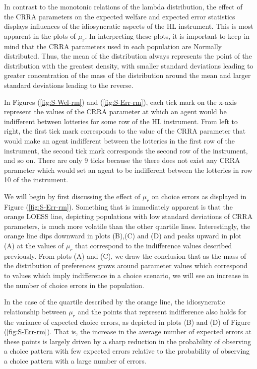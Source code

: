 \documentclass[11pt,a4paper]{report}
\begin{document}
In contrast to the monotonic relations of the lambda distribution, the effect of the CRRA parameters on the expected welfare and expected error statistics displays influences of the idiosyncratic aspects of the HL instrument.
This is most apparent in the plots of $\mu_r$.
In interpreting these plots, it is important to keep in mind that the CRRA parameters used in each population are Normally distributed.
Thus, the mean of the distribution always represents the point of the distribution with the greatest density, with smaller standard deviations leading to greater concentration of the mass of the distribution around the mean and larger standard deviations leading to the reverse.

In Figures (\ref{fig:S-Wel-rm}) and (\ref{fig:S-Err-rm}), each tick mark on the x-axis represent the values of the CRRA parameter at which an agent would be indifferent between lotteries for some row of the HL instrument.
From left to right, the first tick mark corresponds to the value of the CRRA parameter that would make an agent indifferent between the lotteries in the first row of the instrument, the second tick mark corresponds the second row of the instrument, and so on.
There are only 9 ticks because the there does not exist any CRRA parameter which would set an agent to be indifferent between the lotteries in row 10 of the instrument.

We will begin by first discussing the effect of $\mu_r$ on choice errors as displayed in Figure (\ref{fig:S-Err-rm}).
Something that is immediately apparent is that the orange LOESS line, depicting populations with low standard deviations of CRRA parameters, is much more volatile than the other quartile lines.
Interestingly, the orange line dips downward in plots (B),(C) and (D) and peaks upward in plot (A) at the values of $\mu_r$ that correspond to the indifference values described previously.
From plots (A) and (C), we draw the conclusion that as the mass of the distribution of preferences grows around parameter values which correspond to values which imply indifference in a choice scenario, we will see an increase in the number of choice errors in the population.

In the case of the quartile described by the orange line, the idiosyncratic relationship between $\mu_r$ and the points that represent indifference also holds for the variance of expected choice errors, as depicted in plots (B) and (D) of Figure (\ref{fig:S-Err-rm}).
That is, the increase in the average number of expected errors at these points is largely driven by a sharp reduction in the probability of observing a choice pattern with few expected errors relative to the probability of observing a choice pattern with a large number of errors.{\footnotemark}
\end{document}
